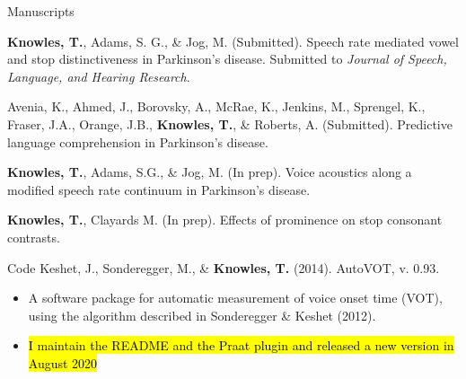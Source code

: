 \documentclass{resume} %
\begin{document}
\begin{rSection}{Manuscripts}

{\bf Knowles, T.}, Adams, S. G., \& Jog, M. (Submitted). Speech rate mediated vowel and stop distinctiveness in Parkinson’s disease. Submitted to \emph{Journal of Speech, Language, and Hearing Research}.
	
Avenia, K., Ahmed, J., Borovsky, A., McRae, K., Jenkins, M., Sprengel, K., Fraser, J.A., Orange, J.B., {\bf Knowles, T.}, \& Roberts, A. (Submitted). Predictive language comprehension in Parkinson’s disease.

{\bf Knowles, T.}, Adams, S.G., \& Jog, M. (In prep). Voice acoustics along a modified speech rate continuum in Parkinson's disease.

{\bf Knowles, T.}, Clayards M. (In prep). Effects of prominence on stop consonant contrasts.

\end{rSection}



\begin{rSection}{Code}
	Keshet, J., Sonderegger, M., \& {\bf Knowles, T.} (2014). AutoVOT, v. 0.93.
	\begin{itemize}
			\renewcommand\labelitemi{$\cdot$}
		\item A software package for automatic measurement of voice onset time (VOT), using the algorithm described in Sonderegger \& Keshet (2012).
		\item \hl{I maintain the README and the Praat plugin and released a new version in August 2020}
	\end{itemize}
	
\end{rSection}


\end{document}
